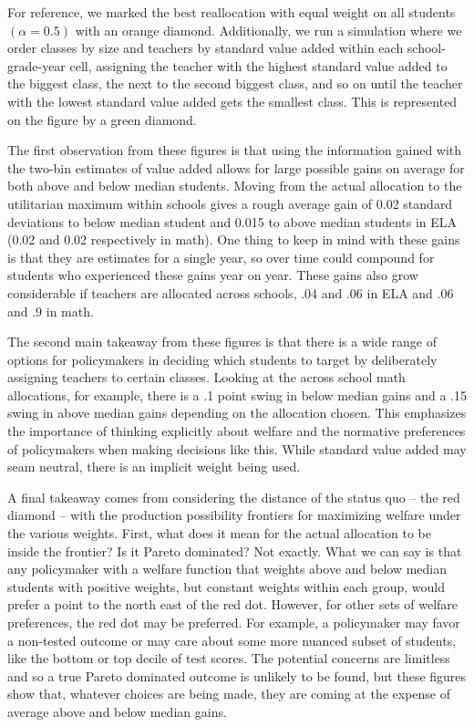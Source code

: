 \documentclass[12pt]{article}
\theoremstyle{definition}
\theoremstyle{definition}
\theoremstyle{definition}
\theoremstyle{definition}
\begin{document}
	For reference, we marked the best reallocation with equal weight on all students $(\alpha=0.5)$ with an orange diamond. Additionally, we run a simulation where we order classes by size and teachers by standard value added within each school-grade-year cell, assigning the teacher with the highest standard value added to the biggest class, the next to the second biggest class, and so on until the teacher with the lowest standard value added gets the smallest class. This is represented on the figure by a green diamond.

	The first observation from these figures is that using the information gained with the two-bin estimates of value added allows for large possible gains on average for both above and below median students. Moving from the actual allocation to the utilitarian maximum within schools gives a rough average gain of 0.02 standard deviations to below median student and 0.015 to above median students in ELA (0.02 and 0.02 respectively in math). One thing to keep in mind with these gains is that they are estimates for a single year, so over time could compound for students who experienced these gains year on year. These gains also grow considerable if teachers are allocated across schools, .04 and .06 in ELA and .06 and .9 in math. 

	The second main takeaway from these figures is that there is a wide range of options for policymakers in deciding which students to target by deliberately assigning teachers to certain classes. Looking at the across school math allocations, for example, there is a .1 point swing in below median gains and a .15 swing in above median gains depending on the allocation chosen. This emphasizes the importance of thinking explicitly about welfare and the normative preferences of policymakers when making decisions like this. While standard value added may seam neutral, there is an implicit weight being used. 
 
	A final takeaway comes from considering the distance of the status quo – the red diamond – with the production possibility frontiers for maximizing welfare under the various weights. First, what does it mean for the actual allocation to be inside the frontier? Is it Pareto dominated? Not exactly. What we can say is that any policymaker with a welfare function that weights above and below median students with positive weights, but constant weights within each group, would prefer a point to the north east of the red dot. However, for other sets of welfare preferences, the red dot may be preferred. For example, a policymaker may favor a non-tested outcome or may care about some more nuanced subset of students, like the bottom or top decile of test scores. The potential concerns are limitless and so a true Pareto dominated outcome is unlikely to be found, but these figures show that, whatever choices are being made, they are coming at the expense of average above and below median gains.
\end{document}
